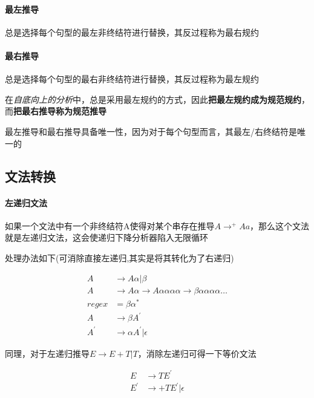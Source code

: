 \documentclass[UTF8]{ctexart} %
\begin{document}
\paragraph{最左推导} 总是选择每个句型的最左非终结符进行替换，其反过程称为最右规约

\paragraph{最右推导} 总是选择每个句型的最右非终结符进行替换，其反过程称为最左规约

在\emph{自底向上的分析}中，总是采用最左规约的方式，因此\textbf{把最左规约成为规范规约}，而\textbf{把最右推导称为规范推导}

最左推导和最右推导具备唯一性，因为对于每个句型而言，其最左/右终结符是唯一的

\subsection{文法转换}

\paragraph{左递归文法} 如果一个文法中有一个非终结符A使得对某个串存在推导$A\rightarrow^{+} Aa$，那么这个文法就是左递归文法，这会使递归下降分析器陷入无限循环

处理办法如下(可消除直接左递归,其实是将其转化为了右递归)

\begin{equation}
    \begin{aligned}
        A     & \rightarrow A\alpha|\beta              \\
        A     & \rightarrow A\alpha
        \rightarrow A\alpha\alpha\alpha\alpha
        \rightarrow \beta\alpha\alpha\alpha\alpha\dots \\
        regex & =\beta\alpha^*                         \\
        A     & \rightarrow \beta A^{'}                \\
        A^{'} & \rightarrow \alpha A^{'}|\epsilon
    \end{aligned}
\end{equation}

同理，对于左递归推导$E\rightarrow E+T|T$，消除左递归可得一下等价文法

\begin{equation}
    \begin{aligned}
        E     & \rightarrow TE^{'}           \\
        E^{'} & \rightarrow +TE^{'}|\epsilon
    \end{aligned}
\end{equation}
\end{document}
